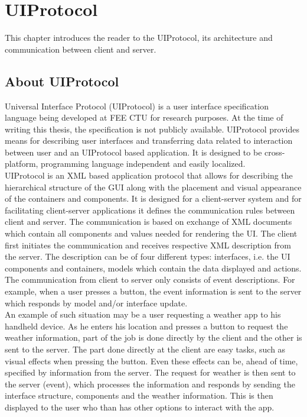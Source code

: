 \chapter{UIProtocol}
This chapter introduces the reader to the UIProtocol, its architecture and communication between client and server.

\section{About UIProtocol}
Universal Interface Protocol (UIProtocol) is a user interface specification language \cite{uip} being developed at FEE CTU for research purposes. At the time of writing this thesis, the specification is not publicly available. UIProtocol provides means for describing user interfaces and transferring data related to interaction between user and an UIProtocol based application. It is designed to be cross-platform, programming language independent and easily localized.\\
UIProtocol is an XML based application protocol that allows for describing the hierarchical structure of the GUI along with the placement and visual appearance of the containers and components. It is designed for a client-server system and for facilitating client-server applications it defines the communication rules between client and server. The communication  is based on exchange of XML documents which contain all components and values needed for rendering the UI. The client first initiates the communication and receives respective XML description from the server. The description can be of four different types: interfaces, i.e. the UI components and containers, models which contain the data displayed and actions. The communication from client to server only consists of event descriptions. For example, when a user presses a button, the event information is sent to the server which responds by model and/or interface update.\\
An example of such situation may be a user requesting a weather app to his handheld device. As he enters his location and presses a button to request the weather information, part of the job is done directly by the client and the other is sent to the server. The part done directly at the client are easy tasks, such as visual effects when pressing the button. Even these effects can be, ahead of time, specified by information from the server. The request for weather is then sent to the server (event), which processes the information and responds by sending the interface structure, components and the weather information. This is then displayed to the user who than has other options to interact with the app.

